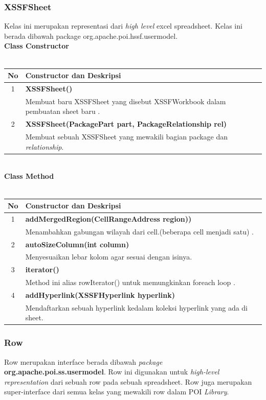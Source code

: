 \subsubsection{XSSFSheet}
Kelas ini merupakan representasi dari \textit{high level} excel spreadsheet. Kelas ini berada dibawah package org.apache.poi.hssf.usermodel.\cite{apachepoi2}
\\
\noindent \textbf{Class Constructor}\\ \\
	\begin{tabular}{|c|p{12cm}|}
		\hline
		\textbf{No} & \textbf{Constructor dan Deskripsi} \\ \hline \hline
		1 & \textbf{XSSFSheet()}\\
			&	Membuat baru XSSFSheet yang disebut XSSFWorkbook dalam pembuatan sheet baru .\\ \hline 
		2 & \textbf{XSSFSheet(PackagePart part, PackageRelationship rel)}\\
			&	Membuat sebuah XSSFSheet yang mewakili bagian package dan \textit{relationship}.\\ \hline
	\end{tabular}
\\
\noindent \textbf{Class Method}\\ \\
	\begin{tabular}{|c|p{12cm}|}
		\hline
		\textbf{No} & \textbf{Constructor dan Deskripsi} \\ \hline \hline
		1 & \textbf{addMergedRegion(CellRangeAddress region))}\\
			&	Menambahkan gabungan wilayah dari cell.(beberapa cell menjadi satu)   .\\ \hline 
		2 & \textbf{autoSizeColumn(int column)}\\
			& Menyesuaikan lebar kolom agar sesuai dengan isinya.\\ \hline
		3 & \textbf{iterator()}\\
			&	Method ini alias rowIterator() untuk memungkinkan foreach loop .\\ \hline
		4 & \textbf{addHyperlink(XSSFHyperlink hyperlink)}\\
			&	Mendaftarkan sebuah hyperlink kedalam koleksi hyperlink yang ada di sheet.\\ \hline	
	\end{tabular}

\subsubsection{Row}
Row merupakan interface berada dibawah \textit{package} \textbf{org.apache.poi.ss.usermodel}. Row ini digunakan untuk \textit{high-level representation} dari sebuah row pada sebuah spreadsheet. Row juga merupakan super-interface dari semua kelas yang mewakili row dalam POI \textit{Library}.\cite{apachepoi2}

